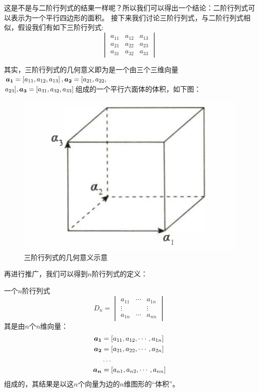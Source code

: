 \documentclass[12pt, a4paper, oneside, UTF8]{ctexbook}
\begin{document}
这是不是与二阶行列式的结果一样呢？所以我们可以得出一个结论：二阶行列式可以表示为一个平行四边形的面积。
\newpage
接下来我们讨论三阶行列式，与二阶行列式相似，假设我们有如下三阶行列式:
\[
    \begin{vmatrix}
      a_{11} & a_{12} & a_{13}\\
      a_{21} & a_{22} & a_{23}\\
      a_{31} & a_{32} & a_{33}      
    \end{vmatrix}
\]

其实，三阶行列式的几何意义即为是一个由三个三维向量$\boldsymbol{a_1}=\left[a_{11}, a_{12}, a_{13}\right], \boldsymbol{a_2}=[a_{21}, a_{22},$\\$ a_{23}], \boldsymbol{a_3}=\left[a_{31}, a_{32}, a_{33}\right]$组成的一个平行六面体的体积，如下图：
\begin{figure}[htbp]
    \centering
    \includegraphics[scale=0.5]{../figure/平行六面体.png}
    \caption{三阶行列式的几何意义示意}
\end{figure}

再进行推广，我们可以得到$n$阶行列式的定义：

\begin{defn}{}{}
一个$n$阶行列式
\[D_n=
    \begin{vmatrix}
      a_{11} & \cdots & a_{1n}\\
      \vdots & & \vdots\\
      a_{1n} & \cdots & a_{nn}  
    \end{vmatrix}    
\]
其是由$n$个$n$维向量：
\[
    \begin{aligned}
    \boldsymbol{a_1}&=\left[a_{11}, a_{12}, \cdots, a_{1n}\right]\\
    \boldsymbol{a_2}&=\left[a_{21}, a_{22}, \cdots, a_{2n}\right]\\
    &\dots\\
    \boldsymbol{a_n}&=\left[a_{n1}, a_{n2}, \cdots, a_{nn}\right]
    \end{aligned} 
\]
组成的，其结果是以这$n$个向量为边的$n$维图形的“体积”。
\end{defn}
\end{document}
